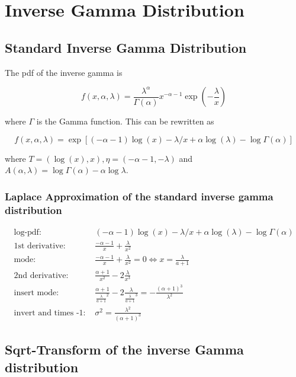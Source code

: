 \section{Inverse Gamma Distribution}

\subsection{Standard Inverse Gamma Distribution}

The pdf of the inverse gamma is 

\begin{equation}
	f(x, \alpha, \lambda) = \frac{\lambda^{\alpha}}{\Gamma(\alpha)} x^{-\alpha-1} \exp(-\frac{\lambda}{x})
	\label{eq:pdf_inverse_gamma}
\end{equation}

where $\Gamma$ is the Gamma function. This can be rewritten as

\begin{equation}
	f(x, \alpha, \lambda) = \exp \left[(-\alpha-1)\log(x) - \lambda/x + \alpha \log(\lambda) -\log\Gamma(\alpha)\right]
	\label{eq:exp_inverse_gamma}
\end{equation}

where $T=(\log(x), x), \eta= (-\alpha-1, -\lambda)$ and $A(\alpha,\lambda) = \log\Gamma(\alpha) - \alpha\log\lambda$.

\subsubsection{Laplace Approximation of the standard inverse gamma distribution}

\begin{align*}
\text{log-pdf: } &(-\alpha-1)\log(x) - \lambda/x + \alpha \log(\lambda) -\log\Gamma(\alpha) \\
\text{1st derivative: }&  \frac{-\alpha-1}{x} + \frac{\lambda}{x^2}\\
\text{mode: }& \frac{-\alpha-1}{x} + \frac{\lambda}{x^2} = 0 \Leftrightarrow x = \frac{\lambda}{a+1}\\
\text{2nd derivative: }&  \frac{\alpha+1}{x^2} - 2\frac{\lambda}{x^3}\\
\text{insert mode: }& \frac{\alpha+1}{\frac{\lambda}{a+1}^2} - 2\frac{\lambda}{\frac{\lambda}{a+1}^3} = -\frac{(\alpha +1)^3}{\lambda^2} \\
\text{invert and times -1: }&\sigma^2 = \frac{\lambda^2}{(\alpha +1)^3}
\end{align*}

\subsection{Sqrt-Transform of the inverse Gamma distribution}

